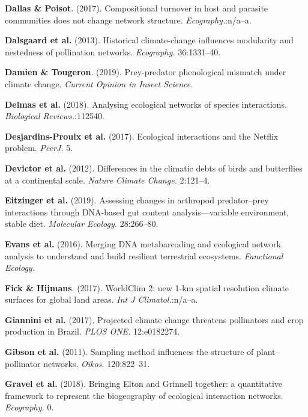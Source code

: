 \leavevmode\hypertarget{ref-DallPois17}{}%
\textbf{Dallas \& Poisot}. (2017). Compositional turnover in host and
parasite communities does not change network structure.
\emph{Ecography.}:n/a--a.

\leavevmode\hypertarget{ref-DalsTroj13}{}%
\textbf{Dalsgaard et al.} (2013). Historical climate-change influences
modularity and nestedness of pollination networks. \emph{Ecography.}
36:1331--40.

\leavevmode\hypertarget{ref-DamiToug19}{}%
\textbf{Damien \& Tougeron}. (2019). Prey-predator phenological mismatch
under climate change. \emph{Current Opinion in Insect Science.}

\leavevmode\hypertarget{ref-DelmBess18}{}%
\textbf{Delmas et al.} (2018). Analysing ecological networks of species
interactions. \emph{Biological Reviews.}:112540.

\leavevmode\hypertarget{ref-DesjLaig17}{}%
\textbf{Desjardins-Proulx et al.} (2017). Ecological interactions and
the Netflix problem. \emph{PeerJ.} 5.

\leavevmode\hypertarget{ref-Devivan12}{}%
\textbf{Devictor et al.} (2012). Differences in the climatic debts of
birds and butterflies at a continental scale. \emph{Nature Climate
Change.} 2:121--4.

\leavevmode\hypertarget{ref-EitzAbre19}{}%
\textbf{Eitzinger et al.} (2019). Assessing changes in arthropod
predator--prey interactions through DNA-based gut content
analysis---variable environment, stable diet. \emph{Molecular Ecology.}
28:266--80.

\leavevmode\hypertarget{ref-EvanKits16}{}%
\textbf{Evans et al.} (2016). Merging DNA metabarcoding and ecological
network analysis to understand and build resilient terrestrial
ecosystems. \emph{Functional Ecology.}

\leavevmode\hypertarget{ref-FickHijm17}{}%
\textbf{Fick \& Hijmans}. (2017). WorldClim 2: new 1-km spatial
resolution climate surfaces for global land areas. \emph{Int J
Climatol.}:n/a--a.

\leavevmode\hypertarget{ref-GianCost17}{}%
\textbf{Giannini et al.} (2017). Projected climate change threatens
pollinators and crop production in Brazil. \emph{PLOS ONE.} 12:e0182274.

\leavevmode\hypertarget{ref-GibsKnot11}{}%
\textbf{Gibson et al.} (2011). Sampling method influences the structure
of plant--pollinator networks. \emph{Oikos.} 120:822--31.

\leavevmode\hypertarget{ref-GravBais18}{}%
\textbf{Gravel et al.} (2018). Bringing Elton and Grinnell together: a
quantitative framework to represent the biogeography of ecological
interaction networks. \emph{Ecography.} 0.

